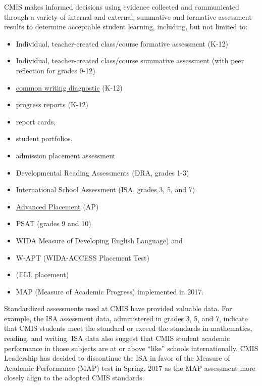 \begin{findings}
CMIS makes informed decisions using evidence collected and communicated through a variety of internal and external, summative and formative assessment results to determine acceptable student learning, including, but not limited to:

\begin{itemize}
\item Individual, teacher-created class/course formative  assessment (K-12)
\item Individual, teacher-created class/course summative assessment (with peer reflection for grades 9-12)
\item \href{https://drive.google.com/drive/folders/0ByVFfrm0zfolLU9Vb0ZBeF9uZjQ?usp=sharing}{common writing diagnostic} (K-12)
\item progress reports (K-12)
\item report cards, 
\item student portfolios, 
\item admission placement assessment 
\item Developmental Reading Assessments (DRA, grades 1-3)
\item \href{https://drive.google.com/drive/folders/0ByVFfrm0zfolfm8tU3BMY1BpVjZaSmpUbUs5aFp5UmM3dm14QXIwV0hEVnhKVGRMV2g4ZU0?usp=sharing}{International School Assessment} (ISA, grades 3, 5, and 7) 
\item \href{https://drive.google.com/a/cmis.ac.th/file/d/0Bw0VZdQtZdSRZkI0bElJZDRuUGg5ZEtaa1ZyWDBwdk5vYWtV/view?usp=sharing}{Advanced Placement} (AP)
\item PSAT (grades 9 and 10)
\item WIDA Measure of Developing English Language) and 
\item W-APT (WIDA-ACCESS Placement Test)
\item (ELL placement)
\item MAP (Measure of Academic Progress) implemented in 2017. 
\end{itemize}
Standardized assessments used at CMIS have provided valuable data. For example, the ISA assessment data, administered in grades 3, 5, and 7, indicate that CMIS students meet the standard or exceed the standards in mathematics, reading, and writing. ISA data also suggest that CMIS student academic performance in those subjects are at or above “like” schools internationally. CMIS Leadership has decided to discontinue the ISA in favor of the Measure of Academic Performance (MAP) test in Spring, 2017 as the MAP assessment more closely align to the adopted CMIS standards. 


\end{findings}
